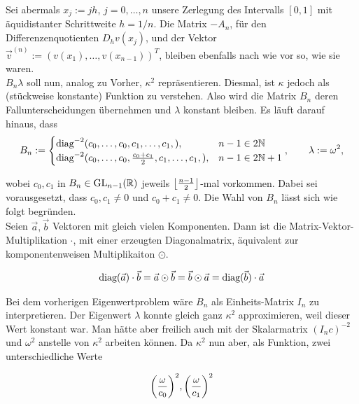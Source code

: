 Sei abermals $x_j := jh$, $j = 0, \ldots, n$ unsere Zerlegung des Intervalls $[0, 1]$ mit äquidistanter Schrittweite $h = 1/n$. Die Matrix $-A_n$, für den Differenzenquotienten $D_h v(x_j)$, und der Vektor $\vec v^{(n)} := (v(x_1), \ldots, v(x_{n-1}))^T$, bleiben ebenfalls nach wie vor so, wie sie waren. \\

$B_n \lambda$ soll nun, analog zu Vorher, $\kappa^2$ repräsentieren. Diesmal, ist $\kappa$ jedoch als (stückweise konstante) Funktion zu verstehen. Also wird die Matrix $B_n$ deren Fallunterscheidungen übernehmen und $\lambda$ konstant bleiben. Es läuft darauf hinaus, dass \\

\begin{align*}
  B_n :=
  \begin{cases}
    \diag^{-2}
    (
      c_0, \ldots, c_0,
      c_1, \ldots, c_1,
    ), & n-1 \in 2 \N \\
    \diag^{-2}
    (
      c_0, \ldots, c_0,
      \frac{c_0 + c_1}{2},
      c_1, \ldots, c_1,
    ), & n-1 \in 2 \N + 1
  \end{cases},
  \qquad
  \lambda := \omega^2,
\end{align*}

wobei $c_0, c_1$ in $B_n \in \GL[n-1]{\R}$ jeweils $\floor{\frac{n-1}{2}}$-mal vorkommen. Dabei sei vorausgesetzt, dass $c_0, c_1 \neq 0$ und $c_0 + c_1 \neq 0$. Die Wahl von $B_n$ lässt sich wie folgt begründen. \\

Seien $\vec a, \vec b$ Vektoren mit gleich vielen Komponenten. Dann ist die Matrix-Vektor-Multiplikation $\cdot$, mit einer erzeugten Diagonalmatrix, äquivalent zur komponentenweisen Multiplikaiton $\odot$.

\begin{align} \label{Diagonalmatrizen}
  \diag(\vec a) \cdot \vec b =
  \vec a \odot \vec b =
  \vec b \odot \vec a =
  \diag(\vec b) \cdot \vec a
\end{align}

Bei dem vorherigen Eigenwertproblem wäre $B_n$ als Einheits-Matrix $I_n$ zu interpretieren. Der Eigenwert $\lambda$ konnte gleich ganz $\kappa^2$ approximieren, weil dieser Wert konstant war. Man hätte aber freilich auch mit der Skalarmatrix $(I_n c)^{-2}$ und $\omega^2$ anstelle von $\kappa^2$ arbeiten können. Da $\kappa^2$ nun aber, als Funktion, zwei unterschiedliche Werte

\begin{align*}
  \pbraces{\frac{\omega}{c_0}}^2,
  \pbraces{\frac{\omega}{c_1}}^2
\end{align*}

